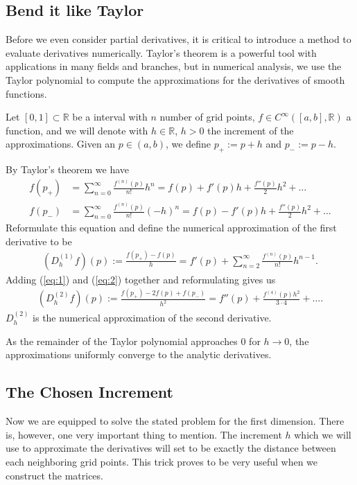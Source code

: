 \subsection{Bend it like Taylor}

Before we even consider partial derivatives, it is critical to introduce a method to evaluate derivatives numerically. Taylor's theorem is a powerful tool with applications in many fields and branches, but in numerical analysis, we use the Taylor polynomial to compute the approximations for the derivatives of smooth functions.

Let \([0, 1] \subset \mathbb{R}\) be a interval with \(n\) number of grid points, \(f \in C^{\infty}([a, b], \mathbb{R})\) a function, and we will denote with \(h \in \mathbb{R}\), \(h > 0\) the increment of the approximations. Given an \(p \in (a, b)\), we define \(p_{+} := p + h\) and \(p_{-} := p - h\).

By Taylor's theorem \cite{H.Amann} we have
\begin{align}
    f(p_{+}) &= \sum^{\infty}_{n = 0} \frac{f^{(n)}(p)}{n!} h^n = f(p) + f'(p)h + \frac{f''(p)}{2}h^2 + \dots \label{eq:1}\\
    f(p_{-}) &= \sum^{\infty}_{n = 0} \frac{f^{(n)}(p)}{n!} (-h)^n = f(p) - f'(p)h + \frac{f''(p)}{2}h^2 + \dots \label{eq:2}
\end{align}
Reformulate this equation and define the numerical approximation of the first derivative to be
\begin{align*}
    (D^{(1)}_h f) (p) := \frac{f(p_{+}) - f(p)}{h} = f'(p) + \sum^{\infty}_{n = 2} \frac{f^{(n)} (p)}{n!}h^{n-1} \text{.}
\end{align*}
Adding (\ref{eq:1}) and (\ref{eq:2}) together and reformulating gives us
\begin{align*}
    (D^{(2)}_h f)(p) := \frac{f(p_{+}) - 2f(p) + f(p_{-})}{h^2} = f''(p) + \frac{f^{(4)}(p)h^2}{3 \cdot 4} + \dots \text{.}
\end{align*}
\(D^{(2)}_h\) is the numerical approximation of the second derivative.

As the remainder of the Taylor polynomial approaches \(0\) for \(h \rightarrow 0\), the approximations uniformly converge to the analytic derivatives.

\subsection{The Chosen Increment}

Now we are equipped to solve the stated problem for the first dimension. There is, however, one very important thing to mention. The increment \(h\) which we will use to approximate the derivatives will set to be exactly the distance between each neighboring grid points. This trick proves to be very useful when we construct the matrices.
